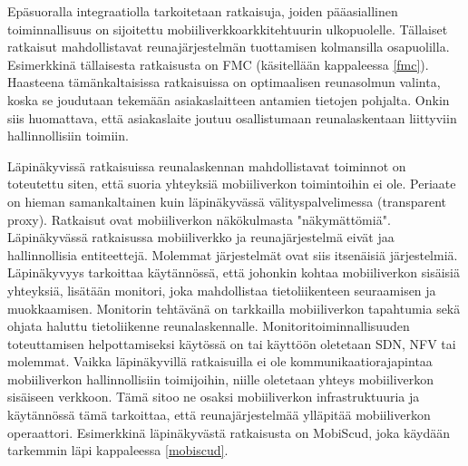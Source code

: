 Epäsuoralla integraatiolla tarkoitetaan ratkaisuja, joiden pääasiallinen toiminnallisuus on sijoitettu mobiiliverkkoarkkitehtuurin ulkopuolelle. 
Tällaiset ratkaisut mahdollistavat reunajärjestelmän tuottamisen kolmansilla osapuolilla. Esimerkkinä tällaisesta ratkaisusta on FMC (käsitellään kappaleessa \ref{fmc}). Haasteena tämänkaltaisissa ratkaisuissa on optimaalisen reunasolmun valinta, koska se joudutaan tekemään asiakaslaitteen antamien tietojen pohjalta. Onkin siis huomattava, että asiakaslaite joutuu osallistumaan reunalaskentaan liittyviin hallinnollisiin toimiin.

Läpinäkyvissä ratkaisuissa reunalaskennan mahdollistavat toiminnot on toteutettu siten, että suoria yhteyksiä mobiiliverkon toimintoihin ei ole. 
Periaate on hieman samankaltainen kuin läpinäkyvässä välityspalvelimessa (transparent proxy).
Ratkaisut ovat mobiiliverkon näkökulmasta "näkymättömiä".
Läpinäkyvässä ratkaisussa mobiiliverkko ja reunajärjestelmä eivät jaa hallinnollisia entiteettejä. Molemmat järjestelmät ovat siis itsenäisiä järjestelmiä.
Läpinäkyvyys tarkoittaa käytännössä, että johonkin kohtaa mobiiliverkon sisäisiä yhteyksiä, lisätään monitori, joka mahdollistaa tietoliikenteen seuraamisen ja muokkaamisen. 
Monitorin tehtävänä on tarkkailla mobiiliverkon tapahtumia sekä ohjata haluttu tietoliikenne reunalaskennalle.
Monitoritoiminnallisuuden toteuttamisen helpottamiseksi käytössä on tai käyttöön oletetaan SDN, NFV tai molemmat.
Vaikka läpinäkyvillä ratkaisuilla ei ole kommunikaatiorajapintaa mobiiliverkon hallinnollisiin toimijoihin, niille oletetaan yhteys mobiiliverkon sisäiseen verkkoon.
Tämä sitoo ne osaksi mobiiliverkon infrastruktuuria ja käytännössä tämä tarkoittaa, että reunajärjestelmää ylläpitää mobiiliverkon operaattori. 
Esimerkkinä läpinäkyvästä ratkaisusta on MobiScud, joka käydään tarkemmin läpi kappaleessa \ref{mobiscud}. 
